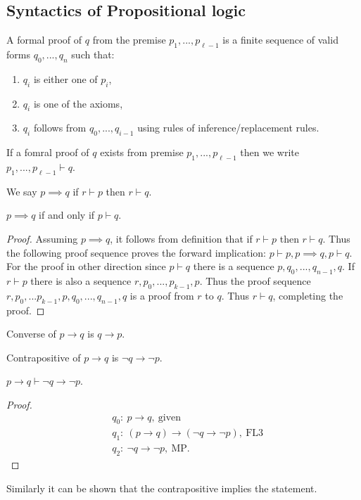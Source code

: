 \subsection{Syntactics of Propositional logic}
\begin{definition}
  A formal proof of $q$ from the premise $p_1,...,p_{\ell -1}$ is a finite sequence of valid forms $q_0,...,q_n$ such that:
  \begin{enumerate}
    \item $q_i$ is either one of $p_i$,
    \item $q_i$ is one of the axioms,
    \item $q_i$ follows from $q_0,...,q_{i-1}$ using rules of inference/replacement rules.
  \end{enumerate}
  If a fomral proof of $q$ exists from premise $p_1,...,p_{\ell -1}$ then we write $p_1,...,p_{\ell -1} \vdash q$. 
\end{definition}
\begin{definition}
  We say $p \implies q$ if $r\vdash p$ then $r \vdash q$.
\end{definition}
\begin{theorem}
  $p\implies q$ if and only if $p\vdash q$.
\end{theorem}
\begin{proof}
  Assuming $p\implies q$, it follows from definition that if $r \vdash p$ then $r\vdash q$. Thus the following proof sequence proves the forward implication: $p\vdash p, p\implies q, p\vdash q$. For the proof in other direction since $p \vdash q$ there is a sequence $p,q_0,...,q_{n-1}, q$. If $r \vdash p$ there is also a sequence $r, p_0,...,p_{k-1}, p$. Thus the proof sequence $r,p_0,...p_{k-1}, p, q_0,...,q_{n-1}, q$ is a proof from $r$ to $q$. Thus $r\vdash q$, completing the proof.
\end{proof}
\begin{definition}
  Converse of $p\to q$ is $q\to p$.  
\end{definition}
\begin{definition}
  Contrapositive of $p\to q$ is $\lnot q \to \lnot p$.
\end{definition}
\begin{proposition}
  $p \to q \vdash \lnot q \to \lnot p$.
\end{proposition}
\begin{proof}
  \begin{align*}
    &q_0:\ p\to q,\ \text{given}\\  
    &q_1:\ (p\to q) \to (\lnot q \to \lnot p),\ \text{FL3}\\
    &q_2:\ \lnot q \to \lnot p,\ \text{MP}. 
  \end{align*}
\end{proof}
Similarly it can be shown that the contrapositive implies the statement.
